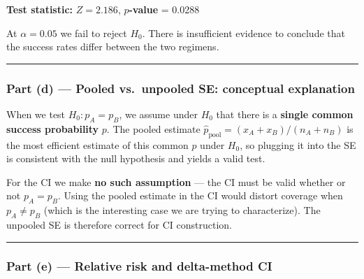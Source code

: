 \documentclass[
  letterpaper,
  DIV=11,
  numbers=noendperiod]{scrartcl}
\begin{document}
\textbf{Test statistic:} \(Z = 2.186\), \textbf{\(p\)-value} = 0.0288

At \(\alpha = 0.05\) we fail to reject \(H_0\). There is insufficient
evidence to conclude that the success rates differ between the two
regimens.

\begin{center}\rule{0.5\linewidth}{0.5pt}\end{center}

\subsubsection{Part (d) --- Pooled vs.~unpooled SE: conceptual
explanation}\label{part-d-pooled-vs.-unpooled-se-conceptual-explanation}

When we test \(H_0: p_A = p_B\), we assume under \(H_0\) that there is a
\textbf{single common success probability} \(p\). The pooled estimate
\(\hat{p}_{\text{pool}} = (x_A + x_B)/(n_A + n_B)\) is the most
efficient estimate of this common \(p\) under \(H_0\), so plugging it
into the SE is consistent with the null hypothesis and yields a valid
test.

For the CI we make \textbf{no such assumption} --- the CI must be valid
whether or not \(p_A = p_B\). Using the pooled estimate in the CI would
distort coverage when \(p_A \neq p_B\) (which is the interesting case we
are trying to characterize). The unpooled SE is therefore correct for CI
construction.

\begin{center}\rule{0.5\linewidth}{0.5pt}\end{center}

\subsubsection{Part (e) --- Relative risk and delta-method
CI}\label{part-e-relative-risk-and-delta-method-ci}
\end{document}
